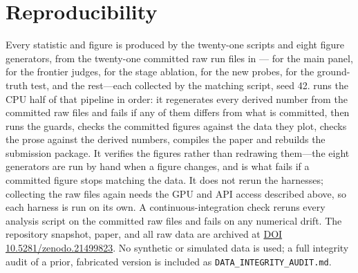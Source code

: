 \documentclass[11pt]{article}
\begin{document}
\section*{Reproducibility}
Every statistic and figure is produced by the twenty-one 
scripts and eight  figure generators, from the twenty-one
committed raw run files in --- for the
main panel,  for the frontier judges,
 for the stage ablation, 
for the new probes,  for the ground-truth test, and the
rest---each collected by the matching  script, seed 42.
 runs the CPU half of that pipeline in order: it regenerates every
derived number from the committed raw files and fails if any of them differs from what
is committed, then runs the guards, checks the committed figures against the data they
plot, checks the prose against the derived numbers, compiles the paper and rebuilds the
submission package. It verifies the figures rather than redrawing them---the eight
 generators are run by hand when a figure changes, and
 is what fails if a committed figure stops matching the data. It does not rerun the harnesses; collecting
the raw files again needs the GPU and API access described above, so each harness is
run on its own.
A continuous-integration check reruns every analysis script on the committed raw files
and fails on any numerical drift. The repository snapshot, paper, and all raw data are
archived at \href{https://doi.org/10.5281/zenodo.21499823}{DOI 10.5281/zenodo.21499823}. No synthetic or
simulated data is used; a full integrity audit of a prior, fabricated version is included
as \texttt{DATA\_INTEGRITY\_AUDIT.md}.
\end{document}
